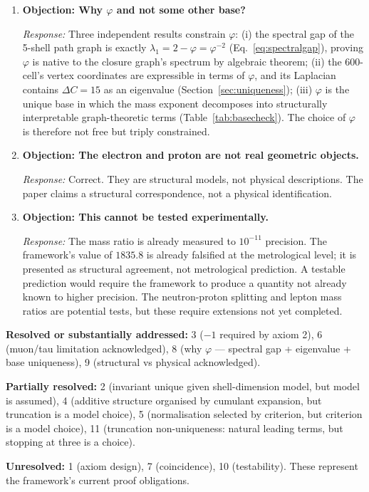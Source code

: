\documentclass[12pt]{article}
\newcommand{\phig}{\varphi}
\begin{document}
\begin{enumerate}
    \item \textbf{Objection: Why $\phig$ and not some other base?}

    \textit{Response:} Three independent results constrain $\phig$: (i) the spectral gap of the 5-shell path graph is exactly $\lambda_1 = 2 - \phig = \phig^{-2}$ (Eq.~\eqref{eq:spectralgap}), proving $\phig$ is native to the closure graph's spectrum by algebraic theorem; (ii) the 600-cell's vertex coordinates are expressible in terms of $\phig$, and its Laplacian contains $\Delta C = 15$ as an eigenvalue (Section~\ref{sec:uniqueness}); (iii) $\phig$ is the unique base in which the mass exponent decomposes into structurally interpretable graph-theoretic terms (Table~\ref{tab:basecheck}). The choice of $\phig$ is therefore not free but triply constrained.

    \item \textbf{Objection: The electron and proton are not real geometric objects.}

    \textit{Response:} Correct. They are structural models, not physical descriptions. The paper claims a structural correspondence, not a physical identification.

    \item \textbf{Objection: This cannot be tested experimentally.}

    \textit{Response:} The mass ratio is already measured to $10^{-11}$ precision. The framework's value of $1835.8$ is already falsified at the metrological level; it is presented as structural agreement, not metrological prediction. A testable prediction would require the framework to produce a quantity not already known to higher precision. The neutron-proton splitting and lepton mass ratios are potential tests, but these require extensions not yet completed.
\end{enumerate}

\vspace{1em}
\noindent\textbf{Resolved or substantially addressed:} 3 ($-1$ required by axiom 2), 6 (muon/tau limitation acknowledged), 8 (why $\phig$ --- spectral gap + eigenvalue + base uniqueness), 9 (structural vs physical acknowledged).

\noindent\textbf{Partially resolved:} 2 (invariant unique given shell-dimension model, but model is assumed), 4 (additive structure organised by cumulant expansion, but truncation is a model choice), 5 (normalisation selected by criterion, but criterion is a model choice), 11 (truncation non-uniqueness: natural leading terms, but stopping at three is a choice).

\noindent\textbf{Unresolved:} 1 (axiom design), 7 (coincidence), 10 (testability). These represent the framework's current proof obligations.



\end{document}
